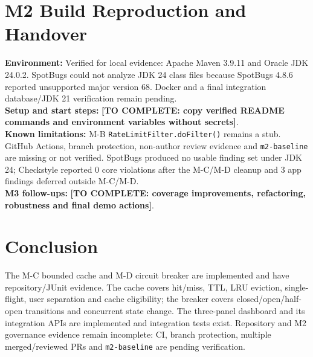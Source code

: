 \documentclass[12pt,a4paper]{article}
\newcommand{\todo}[1]{\textcolor{red!70!black}{\textbf{[TO COMPLETE: #1]}}}
\begin{document}
\section{M2 Build Reproduction and Handover}
\textbf{Environment:} Verified for local evidence: Apache Maven 3.9.11 and Oracle JDK 24.0.2. SpotBugs could not analyze JDK 24 class files because SpotBugs 4.8.6 reported unsupported major version 68. Docker and a final integration database/JDK 21 verification remain pending.\\
\textbf{Setup and start steps:} \todo{copy verified README commands and environment variables without secrets}.\\
\textbf{Known limitations:} M-B \texttt{RateLimitFilter.doFilter()} remains a stub. GitHub Actions, branch protection, non-author review evidence and \texttt{m2-baseline} are missing or not verified. SpotBugs produced no usable finding set under JDK 24; Checkstyle reported 0 core violations after the M-C/M-D cleanup and 3 app findings deferred outside M-C/M-D.\\
\textbf{M3 follow-ups:} \todo{coverage improvements, refactoring, robustness and final demo actions}.

\section*{Conclusion}
The M-C bounded cache and M-D circuit breaker are implemented and have repository/JUnit evidence. The cache covers hit/miss, TTL, LRU eviction, single-flight, user separation and cache eligibility; the breaker covers closed/open/half-open transitions and concurrent state change. The three-panel dashboard and its integration APIs are implemented and integration tests exist. Repository and M2 governance evidence remain incomplete: CI, branch protection, multiple merged/reviewed PRs and \texttt{m2-baseline} are pending verification.
\end{document}
